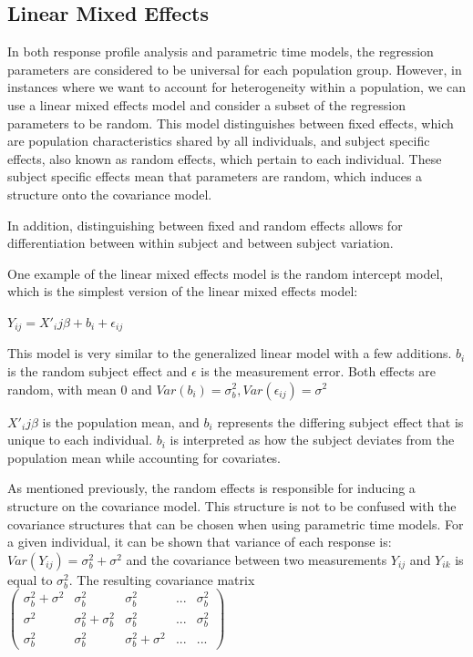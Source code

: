 \documentclass[12pt, twoside]{amherstthesis}
\theoremstyle{definition}
\theoremstyle{definition}
\theoremstyle{definition}
\theoremstyle{remark}
\begin{document}
\hypertarget{linear-mixed-effects}{%
\subsection{Linear Mixed Effects}\label{linear-mixed-effects}}

In both response profile analysis and parametric time models, the regression parameters are considered to be universal for each population group. However, in instances where we want to account for heterogeneity within a population, we can use a linear mixed effects model and consider a subset of the regression parameters to be random. This model distinguishes between fixed effects, which are population characteristics shared by all individuals, and subject specific effects, also known as random effects, which pertain to each individual. These subject specific effects mean that parameters are random, which induces a structure onto the covariance model.

In addition, distinguishing between fixed and random effects allows for differentiation between within subject and between subject variation.

One example of the linear mixed effects model is the random intercept model, which is the simplest version of the linear mixed effects model:

\(Y_{ij} = X'_ij\beta + b_i + \epsilon_{ij}\)

This model is very similar to the generalized linear model with a few additions. \(b_i\) is the random subject effect and \(\epsilon\) is the measurement error. Both effects are random, with mean 0 and \(Var(b_i) = \sigma^2_b, Var(\epsilon_{ij})=\sigma^2\)

\(X'_ij\beta\) is the population mean, and \(b_i\) represents the differing subject effect that is unique to each individual. \(b_i\) is interpreted as how the subject deviates from the population mean while accounting for covariates.

As mentioned previously, the random effects is responsible for inducing a structure on the covariance model. This structure is not to be confused with the covariance structures that can be chosen when using parametric time models. For a given individual, it can be shown that variance of each response is:
\(Var(Y_{ij}) = \sigma^2_b + \sigma^2\) and the covariance between two measurements \(Y_{ij}\) and \(Y_{ik}\) is equal to \(\sigma^2_b\). The resulting covariance matrix \(\begin{pmatrix} \sigma^2_b + \sigma^2 & \sigma^2_b & \sigma^2_b & ... & \sigma^2_b \\ \sigma^2 & \sigma^2_b + \sigma^2_b & \sigma^2_b & ... & \sigma^2_b \\ \sigma^2_b & \sigma^2_b & \sigma^2_b + \sigma^2 & ...& ... \end{pmatrix}\)
\end{document}
